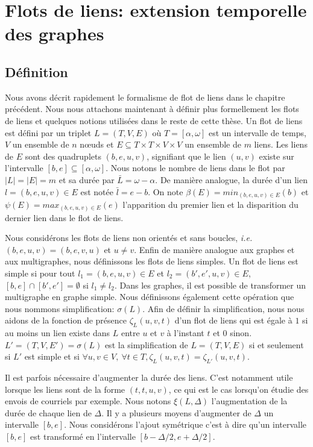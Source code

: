 \chapter{Flots de liens: extension temporelle des graphes}
\minitoc
\label{chap:def_flot}

\section{Définition}
\label{sec:definition}

Nous avons décrit rapidement le formalisme de flot de liens dans le chapitre précédent.
Nous nous attachons maintenant à définir plus formellement les flots de liens et quelques notions utilisées dans le reste de cette thèse.
Un flot de liens est défini par un triplet $L=(T,V,E)$ où $T=[\alpha, \omega]$ est un intervalle de temps, $V$ un ensemble de $n$ n\oe{}uds et $E\subseteq T\times T \times V \times V$ un ensemble de $m$ liens.
Les liens de $E$ sont des quadruplets $(b,e,u,v)$, signifiant que le lien $(u, v)$ existe sur l'intervalle $[b,e] \subseteq [\alpha,\omega]$.
Nous notons le nombre de liens dans le flot par $|L|=|E|=m$ et sa durée par $\bar{L}=\omega-\alpha$.
De manière analogue, la durée d'un lien $l=(b,e,u,v) \in E$ est notée   $\bar{l}=e-b$.
On note $\beta(E)= min_{(b,e,u,v) \in E} (b)$ et $\psi(E)= max_{(b,e,u,v) \in E} (e)$ l'apparition du premier lien et la disparition du dernier lien dans le flot de liens.

Nous considérons les flots de liens non orientés et sans boucles, \emph{i.e.}$(b,e,u,v)=(b,e,v,u)$ et $u \neq v$.
Enfin de manière analogue aux graphes et aux multigraphes, nous définissons les flots de liens simples.
Un flot de liens est simple si pour tout $l_1=(b,e,u,v) \in E$ et $l_2=(b',e',u, v) \in E$, $[b,e]\cap [b', e'] = \emptyset$ si $l_1 \neq l_2$.
Dans les graphes, il est possible de transformer un multigraphe en graphe simple.
Nous définissons également cette opération que nous nommons simplification: $\sigma(L)$.
Afin de définir la simplification, nous nous aidons de la fonction de présence $\zeta_{L}(u,v,t)$ d'un flot de liens qui est égale à $1$ si au moins un lien existe dans $L$ entre $u$ et $v$ à l'instant $t$ et $0$ sinon.
$L'=(T,V,E')= \sigma(L)$ est la simplification de $L=(T,V,E)$ si et seulement si $L'$ est simple et si $\forall u,v \in V,\ \forall t\in T, \zeta_{L}(u,v,t)= \zeta_{L'}(u,v,t)$.

Il est parfois nécessaire d'augmenter la durée des liens.
C'est notamment utile lorsque les liens sont de la forme $(t,t,u,v)$, ce qui est le cas lorsqu'on étudie des envois de courriels par exemple.
Nous notons $\xi(L,\Delta)$ l'augmentation de la durée de chaque lien de $\Delta$.
Il y a plusieurs moyens d'augmenter de $\Delta$ un intervalle $[b,e]$.
Nous considérons l'ajout symétrique c'est à dire qu'un intervalle $[b,e]$ est transformé en l'intervalle $[b-\Delta/2,e+\Delta/2]$.

